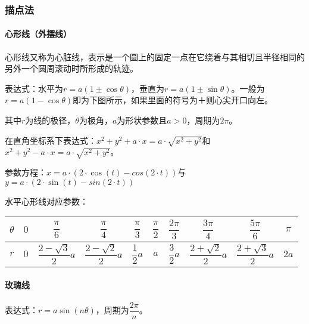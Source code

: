 \documentclass[UTF8, 12pt]{ctexart}
\begin{document}
\subsubsection{描点法}
\paragraph{心形线（外摆线）} \leavevmode \bigskip

心形线又称为心脏线，表示是一个圆上的固定一点在它绕着与其相切且半径相同的另外一个圆周滚动时所形成的轨迹。

表达式：水平为$r=a(1\pm\cos\theta)$，垂直为$r=a(1\pm\sin\theta)$。一般为$r=a(1-\cos\theta)$即为下图所示，如果里面的符号为＋则心尖开口向左。

其中$r$为线的极径，$\theta$为极角，$a$为形状参数且$a>0$，周期为$2\pi$。

在直角坐标系下表达式：$x^2+y^2+a\cdot x=a\cdot\sqrt{x^2+y^2}$和$x^2+y^2-a\cdot x=a\cdot\sqrt{x^2+y^2}$。

参数方程：$x=a\cdot(2\cdot\cos(t)-cos(2\cdot t))$与$y=a\cdot(2\cdot\sin(t)-sin(2\cdot t))$


水平心形线对应参数： \leavevmode \bigskip

\begin{tabular}{|c|c|c|c|c|c|c|c|c|c|}
    \hline
    $\theta$ & $0$ & $\dfrac{\pi}{6}$         & $\dfrac{\pi}{4}$         & $\dfrac{\pi}{3}$ & $\dfrac{\pi}{2}$ & $\dfrac{2\pi}{3}$ & $\dfrac{3\pi}{4}$        & $\dfrac{5\pi}{6}$        & $\pi$ \\ \hline
    $r$      & $0$ & $\dfrac{2-\sqrt{3}}{2}a$ & $\dfrac{2-\sqrt{2}}{2}a$ & $\dfrac{1}{2}a$  & $a$             & $\dfrac{3}{2}a$   & $\dfrac{2+\sqrt{2}}{2}a$ & $\dfrac{2+\sqrt{3}}{2}a$ & $2a$  \\
    \hline
\end{tabular}

\paragraph{玫瑰线} \leavevmode \bigskip

表达式：$r=a\sin(n\theta)$，周期为$\dfrac{2\pi}{n}$。
\end{document}

